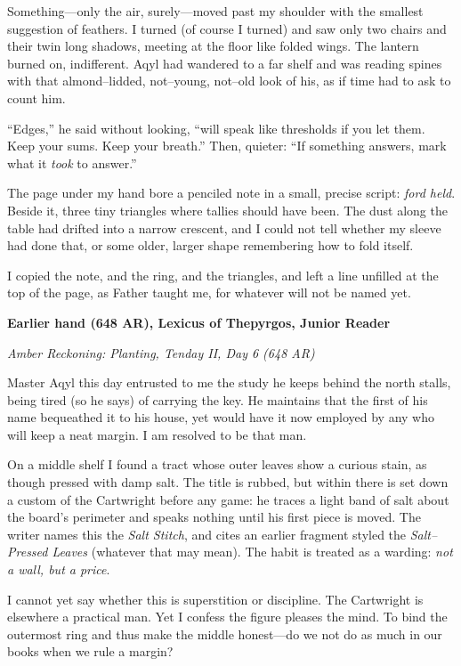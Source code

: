\documentclass[11pt]{article}
\numberwithin{equation}{section} %
\theoremstyle{plain} %
\theoremstyle{definition} %
\theoremstyle{remark} %
\begin{document}
Something—only the air, surely—moved past my shoulder with the smallest suggestion of feathers. I turned (of course I turned) and saw only two chairs and their twin long shadows, meeting at the floor like folded wings. The lantern burned on, indifferent. Aqyl had wandered to a far shelf and was reading spines with that almond–lidded, not–young, not–old look of his, as if time had to ask to count him.

“Edges,” he said without looking, “will speak like thresholds if you let them. Keep your sums. Keep your breath.” Then, quieter: “If something answers, mark what it \emph{took} to answer.”

The page under my hand bore a penciled note in a small, precise script: \textit{ford held}. Beside it, three tiny triangles where tallies should have been. The dust along the table had drifted into a narrow crescent, and I could not tell whether my sleeve had done that, or some older, larger shape remembering how to fold itself.

I copied the note, and the ring, and the triangles, and left a line unfilled at the top of the page, as Father taught me, for whatever will not be named yet.

\medskip

\noindent\textbf{Earlier hand (648 AR), Lexicus of Thepyrgos, Junior Reader}

\noindent\textit{Amber Reckoning: Planting, Tenday II, Day 6 (648 AR)}

Master Aqyl this day entrusted to me the study he keeps behind the north stalls, being tired (so he says) of carrying the key. He maintains that the first of his name bequeathed it to his house, yet would have it now employed by any who will keep a neat margin. I am resolved to be that man.

On a middle shelf I found a tract whose outer leaves show a curious stain, as though pressed with damp salt. The title is rubbed, but within there is set down a custom of the Cartwright before any game: he traces a light band of salt about the board’s perimeter and speaks nothing until his first piece is moved. The writer names this the \textit{Salt Stitch}, and cites an earlier fragment styled the \textit{Salt–Pressed Leaves} (whatever that may mean). The habit is treated as a warding: \emph{not a wall, but a price}.

I cannot yet say whether this is superstition or discipline. The Cartwright is elsewhere a practical man. Yet I confess the figure pleases the mind. To bind the outermost ring and thus make the middle honest—do we not do as much in our books when we rule a margin?
\end{document}
